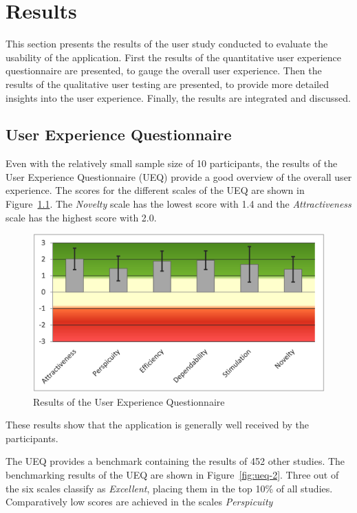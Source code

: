 %
\chapter{Results}
\label{sec:result}

This section presents the results of the user study conducted to evaluate the usability of the application.
First the results of the quantitative user experience questionnaire are presented, to gauge the overall user experience.
Then the results of the qualitative user testing are presented, to provide more detailed insights into the user experience.
Finally, the results are integrated and discussed.

\section{User Experience Questionnaire}
\label{sec:result:ux}

Even with the relatively small sample size of 10 participants, the results of the User Experience Questionnaire (UEQ) provide a good overview of the overall user experience.
The scores for the different scales of the UEQ are shown in Figure~\ref{fig:ueq-1}. 
The \emph{Novelty} scale has the lowest score with 1.4 and the \emph{Attractiveness} scale has the highest score with 2.0.

\begin{figure}[htb]
	\includegraphics[width=\textwidth]{figures/ueq-1.png}
	\caption{Results of the User Experience Questionnaire}
  \label{fig:ueq-1}
\end{figure}

These results show that the application is generally well received by the participants.

The UEQ provides a benchmark containing the results of 452 other studies. 
The benchmarking results of the UEQ are shown in Figure~\ref{fig:ueq-2}.
Three out of the six scales classify as \emph{Excellent}, placing them in the top 10\% of all studies.
Comparatively low scores are achieved in the scales \emph{Perspicuity} 

